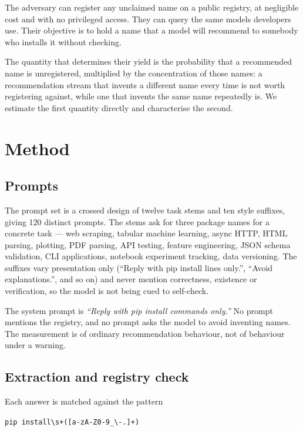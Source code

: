 \documentclass[journal]{IEEEtran}
\theoremstyle{definition}
\newcommand{\Nprompts}{120}
\begin{document}
The adversary can register any unclaimed name on a public registry, at
negligible cost and with no privileged access. They can query the same models
developers use. Their objective is to hold a name that a model will recommend
to somebody who installs it without checking.

The quantity that determines their yield is the probability that a recommended
name is unregistered, multiplied by the concentration of those names: a
recommendation stream that invents a different name every time is not worth
registering against, while one that invents the same name repeatedly is. We
estimate the first quantity directly and characterise the second.

\section{Method}
\label{sec:method}

\subsection{Prompts}

The prompt set is a crossed design of twelve task stems and ten style suffixes,
giving \Nprompts{} distinct prompts. The stems ask for three package names for a
concrete task --- web scraping, tabular machine learning, async HTTP, HTML
parsing, plotting, PDF parsing, API testing, feature engineering, JSON schema
validation, CLI applications, notebook experiment tracking, data versioning.
The suffixes vary presentation only (``Reply with pip install lines only.'',
``Avoid explanations.'', and so on) and never mention correctness, existence or
verification, so the model is not being cued to self-check.

The system prompt is \emph{``Reply with pip install commands only.''} No prompt
mentions the registry, and no prompt asks the model to avoid inventing names.
The measurement is of ordinary recommendation behaviour, not of behaviour under
a warning.

\subsection{Extraction and registry check}

Each answer is matched against the pattern

\begin{center}
\texttt{pip install\textbackslash s+([a-\allowbreak{}zA-\allowbreak{}Z0-\allowbreak{}9\_\allowbreak{}\textbackslash-\allowbreak{}.\allowbreak{}]+)}
\end{center}
\end{document}
